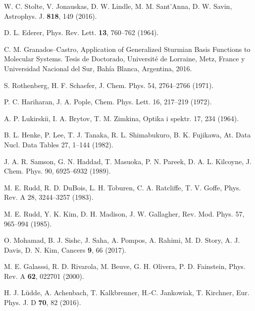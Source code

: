\begin{thebibliography}{9}
W. C. Stolte, V. Jonauskas, D. W. Lindle, M. M. Sant'Anna, D. W. Savin, 
Astrophys. J. \textbf{818}, 149 (2016).

D. L. Ederer, 
Phys. Rev. Lett. \textbf{13}, 760--762 (1964).


C. M. Granados--Castro, 
Application of Generalized Sturmian Basis Functions to Molecular Systems.
Tesis de Doctorado, Universit\'e de Lorraine, Metz, France y 
Universidad Nacional del Sur, Bah\'ia Blanca, Argentina, 2016.

S. Rothenberg, H. F. Schaefer, 
J. Chem. Phys. 54, 2764--2766 (1971).

P. C. Hariharan, J. A. Pople, 
Chem. Phys. Lett. 16, 217--219 (1972).

A. P. Lukirskii, I. A. Brytov, T. M. Zimkina, 
Optika i spektr. 17, 234 (1964).

B. L. Henke, P. Lee, T. J. Tanaka, R. L. Shimabukuro, B. K. Fujikawa, 
At. Data Nucl. Data Tables 27, 1--144 (1982).

J. A. R. Samson, G. N. Haddad, T. Masuoka, P. N. Pareek, D. A. L. Kilcoyne, 
J. Chem. Phys. 90, 6925--6932 (1989).


M. E. Rudd, R. D. DuBois, L. H. Toburen, C. A. Ratcliffe, T. V. Goffe, 
Phys. Rev. A 28, 3244--3257 (1983).

M. E. Rudd, Y. K. Kim, D. H. Madison, J. W. Gallagher, 
Rev. Mod. Phys. 57, 965--994 (1985).


O. Mohamad, B. J. Sishc, J. Saha, A. Pompos, A. Rahimi, M. D. Story, 
A. J. Davis, D. N. Kim, 
Cancers \textbf{9}, 66 (2017).

M. E. Galasssi, R. D. Rivarola, M. Beuve, G. H. Olivera, P. D. Fainstein, 
Phys. Rev. A \textbf{62}, 022701 (2000).

H. J. L\"udde, A. Achenbach, T. Kalkbrenner, H.-C. Jankowiak, T. Kirchner,
Eur. Phys. J. D \textbf{70}, 82 (2016).


\end{thebibliography}
